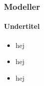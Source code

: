 
\begin{frame}
\frametitle{Modeller}
\framesubtitle{Undertitel} %
    \begin{itemize}
        \item{hej}
        \pause
        \item{hej}
        \pause
        \item{hej}
    \end{itemize}
\end{frame}
    
